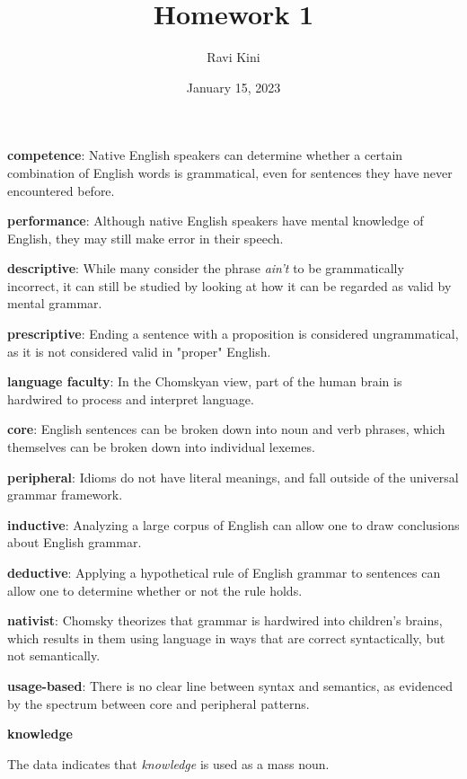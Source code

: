 \documentclass{article}
\title{Homework 1}
\author{Ravi Kini}
\date{January 15, 2023}
\begin{document}
\maketitle

\textbf{competence}: Native English speakers can determine whether a certain combination of English words is grammatical, even for sentences they have never encountered before.

\textbf{performance}: Although native English speakers have mental knowledge of English, they may still make error in their speech.

\textbf{descriptive}: While many consider the phrase \textit{ain't} to be grammatically incorrect, it can still be studied by looking at how it can be regarded as valid by mental grammar.

\textbf{prescriptive}: Ending a sentence with a proposition is considered ungrammatical, as it is not considered valid in "proper" English.

\textbf{language faculty}: In the Chomskyan view, part of the human brain is hardwired to process and interpret language.

\textbf{core}: English sentences can be broken down into noun and verb phrases, which themselves can be broken down into individual lexemes.

\textbf{peripheral}: Idioms do not have literal meanings, and fall outside of the universal grammar framework.

\textbf{inductive}: Analyzing a large corpus of English can allow one to draw conclusions about English grammar.

\textbf{deductive}: Applying a hypothetical rule of English grammar to sentences can allow one to determine whether or not the rule holds.

\textbf{nativist}: Chomsky theorizes that grammar is hardwired into children's brains, which results in them using language in ways that are correct syntactically, but not semantically.

\textbf{usage-based}: There is no clear line between syntax and semantics, as evidenced by the spectrum between core and peripheral patterns.
\clearpage

\textbf{knowledge}
\begin{exe}
\end{exe}
The data indicates that \textit{knowledge} is used as a mass noun.
\end{document}
